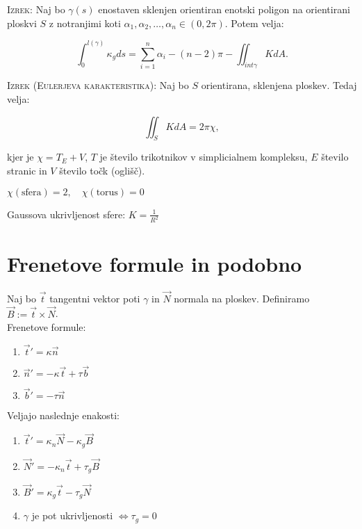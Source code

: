 \documentclass[8pt,a4paper]{amsart}
\theoremstyle{definition} %
\theoremstyle{plain} %
\begin{document}
\textsc{Izrek: }Naj bo $\gamma (s)$ enostaven sklenjen orientiran enotski poligon na orientirani ploskvi $S$ z notranjimi koti $\alpha_1, \alpha_2, \ldots ,\alpha_n \in (0,2 \pi)$. Potem velja:

$$
\int_0^{l(\gamma)} \kappa_g ds = \sum_{i=1}^n \alpha_i - (n-2)\pi - \iint_{int \gamma}K dA.
$$

\textsc{Izrek (Eulerjeva karakteristika): }Naj bo $S$ orientirana, sklenjena ploskev. Tedaj velja:

$$
\iint_S KdA = 2\pi \chi ,
$$

kjer je $\chi = T_E+V$, $T$ je število trikotnikov v simplicialnem kompleksu, $E$ število stranic in $V$ število točk (oglišč).

$\chi (\text{sfera}) = 2, \quad \chi(\text{torus}) = 0$

Gaussova ukrivljenost sfere: $K = \frac{1}{R^2}$

\section*{\textbf{Frenetove formule in podobno}} %

Naj bo $\vec{t}$ tangentni vektor poti $\gamma$ in $\vec{N}$ normala na ploskev. Definiramo $\vec{B}:=\vec{t} \times \vec{N}$.
\\

Frenetove formule:

\begin{enumerate}

\item $\vec{t}' = \kappa \vec{n}$

\item $\vec{n}'= -\kappa \vec{t} + \tau \vec{b}$

\item $\vec{b}' = -\tau \vec{n}$

\end{enumerate}

Veljajo naslednje enakosti:

\begin{enumerate}

\item $\vec{t}' = \kappa_n \vec{N} - \kappa_g \vec{B}$

\item $\vec{N}' = -\kappa_n \vec{t} + \tau_g \vec{B}$

\item $\vec{B}' = \kappa_g \vec{t} - \tau_g \vec{N}$

\item $\gamma$ je pot ukrivljenosti $\Longleftrightarrow \tau_g = 0$

\end{enumerate}
\end{document}
